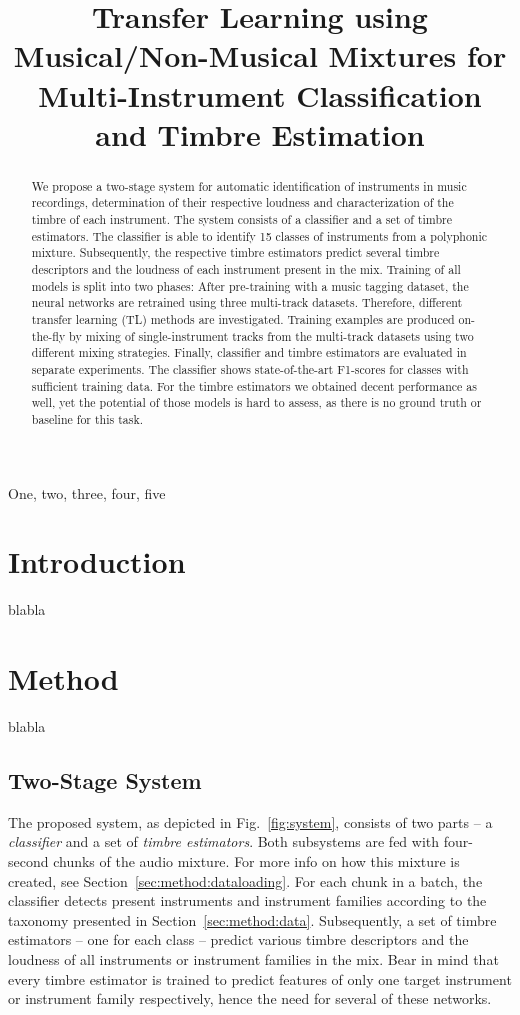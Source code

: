 \documentclass{article}
\title{Transfer Learning using Musical/Non-Musical Mixtures for Multi-Instrument Classification and Timbre Estimation}
\begin{document}
%
\maketitle
%
\begin{abstract}
We propose a two-stage system for automatic identification of instruments in music recordings, determination of their respective loudness and characterization of the timbre of each instrument. The system consists of a classifier and a set of timbre estimators. The classifier is able to identify 15 classes of instruments from a polyphonic mixture. Subsequently, the respective timbre estimators predict several timbre descriptors and the loudness of each instrument present in the mix. Training of all models is split into two phases: After pre-training with a music tagging dataset, the neural networks are retrained using three multi-track datasets. Therefore, different transfer learning (TL) methods are investigated. Training examples are produced on-the-fly by mixing of single-instrument tracks from the multi-track datasets using two different mixing strategies. Finally, classifier and timbre estimators are evaluated in separate experiments. The classifier shows state-of-the-art F1-scores for classes with sufficient training data. For the timbre estimators we obtained decent performance as well, yet the potential of those models is hard to assess, as there is no ground truth or baseline for this task.
\end{abstract}
%
\begin{keywords}
One, two, three, four, five
\end{keywords}
%
\section{Introduction}
\label{sec:intro}

blabla

\section{Method}
\label{sec:method}
blabla

\subsection{Two-Stage System}
\label{sec:method:system}
The proposed system, as depicted in Fig.~\ref{fig:system}, consists of two parts -- a \textit{classifier} and a set of \textit{timbre estimators}. Both subsystems are fed with four-second chunks of the audio mixture. For more info on how this mixture is created, see Section~\ref{sec:method:dataloading}. For each chunk in a batch, the classifier detects present instruments and instrument families according to the taxonomy presented in Section~\ref{sec:method:data}. Subsequently, a set of timbre estimators -- one for each class -- predict various timbre descriptors and the loudness of all instruments or instrument families in the mix. Bear in mind that every timbre estimator is trained to predict features of only one target instrument or instrument family respectively, hence the need for several of these networks.
\end{document}

